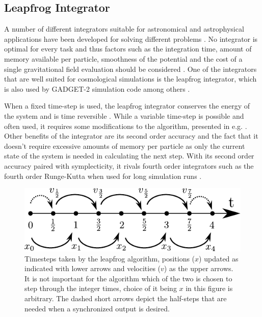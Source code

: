 \documentclass[english, oneside]{HYgradu}
\begin{document}
\subsection{Leapfrog Integrator} \label{sect:leapfrog}
A number of different integrators suitable for astronomical and astrophysical applications have been developed  for solving different problems \citep{binney2008galactic}. No integrator is optimal for every task and thus factors such as the integration time, amount of memory available per particle, smoothness of the potential and the cost of a single gravitational field evaluation should be considered \citep{binney2008galactic}. One of the integrators that are well suited for cosmological simulations is the leapfrog integrator, which is also used by GADGET-2 simulation code among others \citep{springel2005cosmological}.

When a fixed time-step is used, the leapfrog integrator conserves the energy of the system and is time reversible \citep{binney2008galactic}. While a variable time-step is possible and often used, it requires some modifications to the algorithm, presented in e.g. \citet{springel2005cosmological}. Other benefits of the integrator are its second order accuracy and the fact that it doesn't require excessive amounts of memory per particle as only the current state of the system is needed in calculating the next step\citep{binney2008galactic}. With its second order accuracy paired with symplecticity, it rivals fourth order integrators such as the fourth order Runge-Kutta when used for long simulation runs \citep{binney2008galactic}.


%    

\begin{figure}
\centering
\includegraphics{kuvat/tex/leapfrog.pdf}
\caption{Timesteps taken by the leapfrog algorithm, positions ($x$) updated as indicated with lower arrows and velocities ($v$) as the upper arrows. It is not important for the algorithm which of the two is chosen to step through the integer times, choice of it being $x$ in this figure is arbitrary. The dashed short arrows depict the half-steps that are needed when a synchronized output is desired.}\label{fig:leapfrog}
\end{figure}
\end{document}
